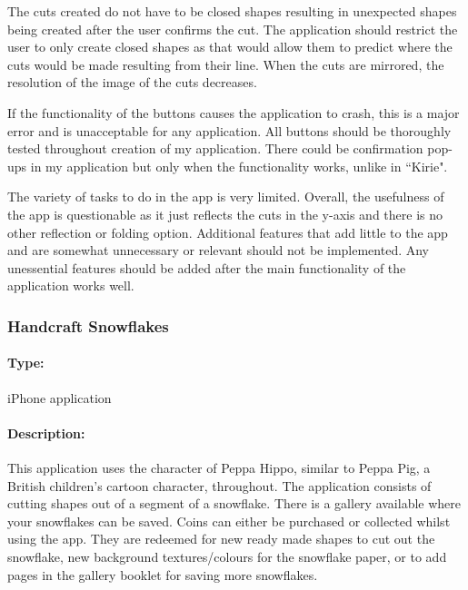 \documentclass[11pt]{article}
\begin{document}
                The cuts created do not have to be closed shapes resulting in unexpected shapes being created after the user confirms the cut. The application should restrict the user to only create closed shapes as that would allow them to predict where the cuts would be made resulting from their line. When the cuts are mirrored, the resolution of the image of the cuts decreases. %
               
                If the functionality of the buttons causes the application to crash, this is a major error and is unacceptable for any application. All buttons should be thoroughly tested throughout creation of my application. There could be confirmation pop-ups in my application but only when the functionality works, unlike in ``Kirie".
                
                The variety of tasks to do in the app is very limited. Overall, the usefulness of the app is questionable as it just reflects the cuts in the y-axis and there is no other reflection or folding option. Additional features that add little to the app and are somewhat unnecessary or relevant should not be implemented. Any unessential features should be added after the main functionality of the application works well.
                
                
                 \subsubsection{Handcraft Snowflakes}
            
                \paragraph{Type:} iPhone application \cite{PeppaHippo}

                \paragraph{Description:}
                This application uses the character of Peppa Hippo, similar to Peppa Pig, a British children's cartoon character, throughout. The application consists of cutting shapes out of a segment of a snowflake. There is a gallery available where your snowflakes can be saved. Coins can either be purchased or collected whilst using the app. They are redeemed for new ready made shapes to cut out the snowflake, new background textures/colours for the snowflake paper, or to add pages in the gallery booklet for saving more snowflakes. 
\end{document}
